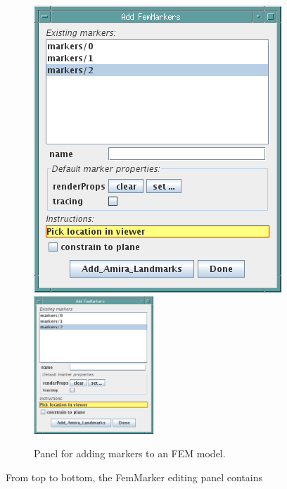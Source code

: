 \documentclass{article}
\begin{document}
\begin{figure}
\begin{center}
\iflatexml
\includegraphics[]{images/addFemMarkersPanel}
\else
\includegraphics[width=0.40\textwidth]{images/addFemMarkersPanel}
\fi
\end{center}
\caption{Panel for adding markers to an FEM model.}%
\label{addFemMarkersPanelFig}
\end{figure}

From top to bottom, the FemMarker editing panel contains
\end{document}
